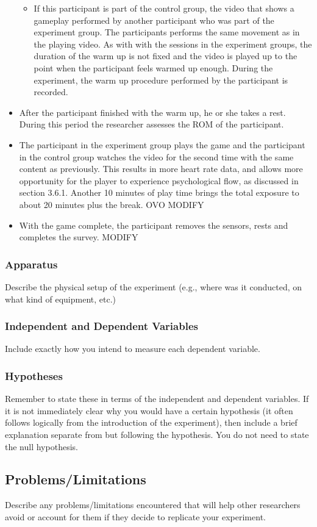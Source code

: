 \begin{itemize}
\begin{itemize}
\item  If this participant is part of the control group, the video that shows a gameplay performed by another participant who was part of the experiment group. The participants performs the same movement as in the playing video. As with with the sessions in the experiment groups, the duration of the warm up is not fixed and the 
video is played up to the point when the participant feels warmed up enough. During the experiment, the warm up procedure performed by the participant is recorded.
\end{itemize}
\item After the participant finished with the warm up, he or she takes a rest. During this period the researcher assesses the ROM of the participant. 
\item The participant in the experiment group plays the game and the participant in the control group watches the video for the second time with the same content as previously. This results in more heart rate data, and allows more opportunity for the player
to experience psychological flow, as discussed in section 3.6.1. Another 10 minutes of play time
brings the total exposure to about 20 minutes plus the break. OVO MODIFY
\item With the game complete, the participant removes the sensors, rests and completes the survey. MODIFY
\end{itemize}
\subsubsection{Apparatus}
Describe the physical setup of the experiment (e.g., where was it conducted, on what kind of equipment, etc.)
\subsubsection{Independent and Dependent Variables}
Include exactly how you intend to measure each dependent variable. 
\subsubsection{Hypotheses}
Remember to state these in terms of the independent and dependent variables. If it is not immediately clear why you would have a certain hypothesis (it often follows logically from the introduction of the experiment), then include a brief explanation separate from but following the hypothesis. You do not need to state the null hypothesis.
\subsection{Problems/Limitations}
Describe any problems/limitations encountered that will help other researchers avoid or account for them if they decide to replicate your experiment.
